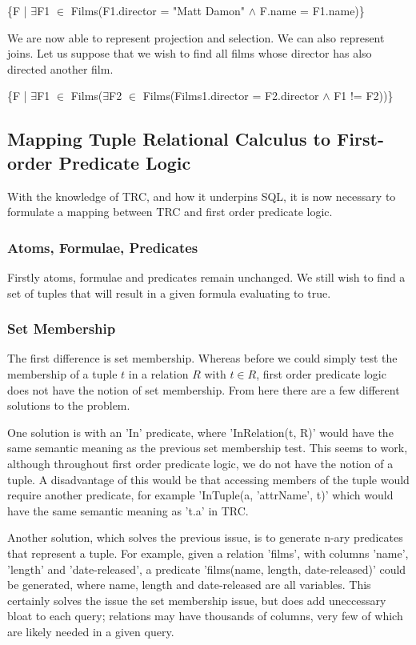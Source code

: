 \documentclass[a4paper, 11pt]{article}
\begin{document}
      \{F | $\exists$F1 $\in$ Films(F1.director = "Matt Damon" $\land$ F.name =
      F1.name)\}

      We are now able to represent projection and selection. We can also
      represent joins. Let us suppose that we wish to find all films whose
      director has also directed another film.

      \{F | $\exists$F1 $\in$ Films($\exists$F2 $\in$ Films(Films1.director =
      F2.director $\land$ F1 != F2))\}

  \subsection{Mapping Tuple Relational Calculus to First-order Predicate Logic}
    With the knowledge of TRC, and how it underpins SQL, it is now necessary to
    formulate a mapping between TRC and first order predicate logic.

    \subsubsection{Atoms, Formulae, Predicates}
      Firstly atoms, formulae and predicates remain unchanged. We still wish to
      find a set of tuples that will result in a given formula evaluating to
      true.

    \subsubsection{Set Membership}
      The first difference is set membership. Whereas before we could simply
      test the membership of a tuple $t$ in a relation $R$ with $t \in R$, first order
      predicate logic does not have the notion of set membership. From here
      there are a few different solutions to the problem.

      One solution is with an 'In' predicate, where 'InRelation(t, R)' would
      have the same semantic meaning as the previous set membership test. This
      seems to work, although throughout first order predicate logic, we do not have the
      notion of a tuple. A disadvantage of this would be that accessing members
      of the tuple would require another predicate, for example 'InTuple(a,
      'attrName', t)' which would have the same semantic meaning as 't.a' in
      TRC.

      Another solution, which solves the previous issue, is to generate n-ary
      predicates that represent a tuple. For example, given a relation 'films',
      with columns 'name', 'length' and 'date-released', a predicate
      'films(name, length, date-released)' could be generated, where name,
      length and date-released are all variables. This certainly solves the
      issue the set membership issue, but does add uneccessary bloat to each
      query; relations may have thousands of columns, very few of which are
      likely needed in a given query.
\end{document}
